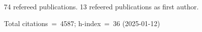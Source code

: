 74 refereed publications. 13 refeered publications as first author.

Total citations~=~4587; h-index~=~36 (2025-01-12)
